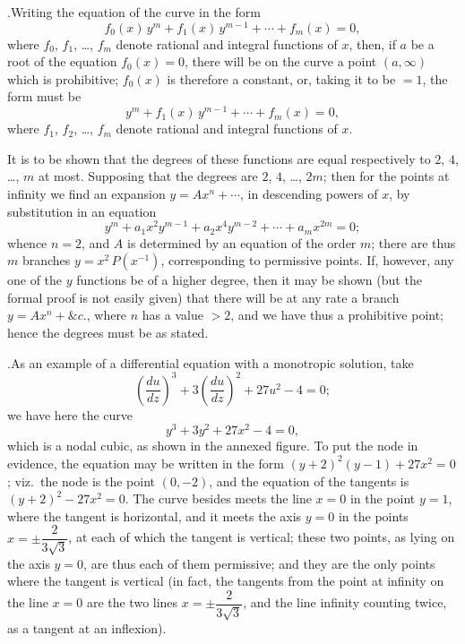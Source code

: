 \documentclass[11pt]{article}
\begin{document}
\medskip

.\quad Writing the equation of the curve in the form
\[
f_{0}(x)\,y^{m} + f_{1}(x)\,y^{m-1} + \cdots + f_{m}(x) = 0,
\]
where $f_{0}$, $f_{1}$, \ldots, $f_{m}$ denote rational and integral functions of $x$, then, if $a$ be a root of the equation $f_{0}(x) = 0$, there will be on the curve a point $(a,\infty)$ which is prohibitive; $f_{0}(x)$ is therefore a constant, or, taking it to be $=1$, the form must be
\[
y^{m} + f_{1}(x)\,y^{m-1} + \cdots + f_{m}(x) = 0,
\]
where $f_{1}$, $f_{2}$, \ldots, $f_{m}$ denote rational and integral functions of $x$.

It is to be shown that the degrees of these functions are equal respectively to $2$, $4$, \ldots, $m$ at most. Supposing that the degrees are $2$, $4$, \ldots, $2m$; then for the points at infinity we find an expansion $y = Ax^{n} + \cdots$, in descending powers of $x$, by substitution in an equation
\[
y^{m} + a_{1}x^{2}y^{m-1} + a_{2}x^{4}y^{m-2} + \cdots + a_{m}x^{2m} = 0;
\]
whence $n = 2$, and $A$ is determined by an equation of the order $m$; there are thus $m$ branches $y = x^{2}\,P(x^{-1})$, corresponding to permissive points. If, however, any one of the $y$ functions be of a higher degree, then it may be shown (but the formal proof is not easily given) that there will be at any rate a branch $y = Ax^{n} + \&c.$, where $n$ has a value $>2$, and we have thus a prohibitive point; hence the degrees must be as stated.

\medskip

.\quad As an example of a differential equation with a monotropic solution, take
\[
\left(\frac{du}{dz}\right)^{3} + 3\left(\frac{du}{dz}\right)^{2} + 27u^{2} - 4 = 0;
\]
we have here the curve
\[
y^{3} + 3y^{2} + 27x^{2} - 4 = 0,
\]
which is a nodal cubic, as shown in the annexed figure. To put the node in evidence, the equation may be written in the form $(y+2)^{2}(y-1) + 27x^{2} = 0$; viz.\ the node is the point $(0,-2)$, and the equation of the tangents is $(y+2)^{2} - 27x^{2} = 0$. The curve besides meets the line $x=0$ in the point $y=1$, where the tangent is horizontal, and it meets the axis $y=0$ in the points $x = \pm \dfrac{2}{3\sqrt{3}}$, at each of which the tangent is vertical; these two points, as lying on the axis $y=0$, are thus each of them permissive; and they are the only points where the tangent is vertical (in fact, the tangents from the point at infinity on the line $x=0$ are the two lines $x = \pm \dfrac{2}{3\sqrt{3}}$, and the line infinity counting twice, as a tangent at an inflexion).
\end{document}
